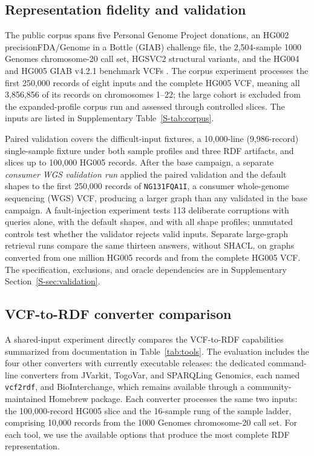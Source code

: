 \documentclass[pdflatex,sn-mathphys-num]{sn-jnl}
\begin{document}
\subsection{Representation fidelity and validation}\label{subsec:eval-fidelity}
The public corpus spans five Personal Genome Project donations, an HG002 precisionFDA/Genome in a Bottle (GIAB) challenge file, the 2,504-sample 1000 Genomes chromosome-20 call set, HGSVC2 structural variants, and the HG004 and HG005 GIAB v4.2.1 benchmark VCFs \cite{personal_genome_proj,nist_gib_2025,thousand_genomes_2015,hgsvc_2021,giab_v421_2022}.
The corpus experiment processes the first 250,000 records of eight inputs and the complete HG005 VCF, meaning all 3,856,856 of its records on chromosomes 1--22; the large cohort is excluded from the expanded-profile corpus run and assessed through controlled slices.
The inputs are listed in Supplementary Table~\ref{S-tab:corpus}.

Paired validation covers the difficult-input fixtures, a 10,000-line (9,986-record) single-sample fixture under both sample profiles and three RDF artifacts, and slices up to 100,000 HG005 records.
After the base campaign, a separate \emph{consumer WGS validation run} applied the paired validation and the default shapes to the first 250,000 records of \texttt{NG131FQA1I}, a consumer whole-genome sequencing (WGS) VCF, producing a larger graph than any validated in the base campaign.
A fault-injection experiment tests 113 deliberate corruptions with queries alone, with the default shapes, and with all shape profiles; unmutated controls test whether the validator rejects valid inputs.
Separate large-graph retrieval runs compare the same thirteen answers, without SHACL, on graphs converted from one million HG005 records and from the complete HG005 VCF.
The specification, exclusions, and oracle dependencies are in Supplementary Section~\ref{S-sec:validation}.

\subsection{VCF-to-RDF converter comparison}\label{subsec:eval_converters}
A shared-input experiment directly compares the VCF-to-RDF capabilities summarized from documentation in Table~\ref{tab:tools}.
The evaluation includes the four other converters with currently executable releases: the dedicated command-line converters from JVarkit, TogoVar, and SPARQLing Genomics, each named \texttt{vcf2rdf}, and BioInterchange, which remains available through a community-maintained Homebrew package.
Each converter processes the same two inputs: the 100,000-record HG005 slice and the 16-sample rung of the sample ladder, comprising 10,000 records from the 1000 Genomes chromosome-20 call set.
For each tool, we use the available options that produce the most complete RDF representation.
\end{document}
